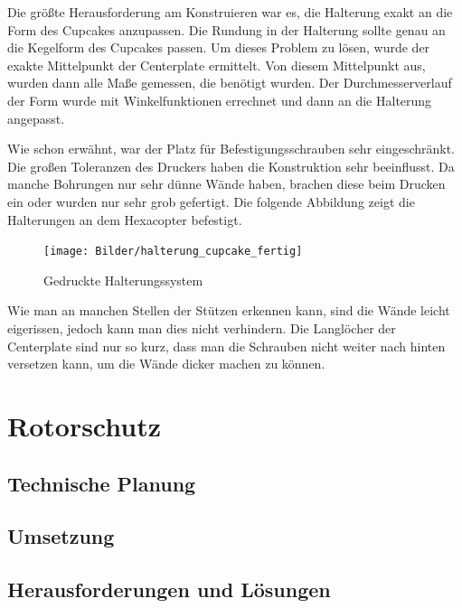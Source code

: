 	Die größte Herausforderung am Konstruieren war es, die Halterung exakt an die Form des Cupcakes anzupassen. Die Rundung in der Halterung sollte genau an die Kegelform des Cupcakes passen.
	Um dieses Problem zu lösen, wurde der exakte Mittelpunkt der Centerplate ermittelt. Von diesem Mittelpunkt aus, wurden dann alle Maße gemessen, die benötigt wurden.
	Der Durchmesserverlauf der Form wurde mit Winkelfunktionen errechnet und dann an die Halterung angepasst.

	Wie schon erwähnt, war der Platz für Befestigungsschrauben sehr eingeschränkt. Die großen Toleranzen des Druckers haben die Konstruktion sehr beeinflusst.
	Da manche Bohrungen nur sehr dünne Wände haben, brachen diese beim Drucken ein oder wurden nur sehr grob gefertigt. Die folgende Abbildung zeigt die Halterungen an dem Hexacopter befestigt.

		\begin{figure}[tbh]
		\begin{centering}
		\texttt{[image: Bilder/halterung\_cupcake\_fertig]}
		\par\end{centering}
		\caption{Gedruckte Halterungssystem}
		\label{halterung_cupcake_fertig}
		\end{figure}

		Wie man an manchen Stellen der Stützen erkennen kann, sind die Wände leicht eigerissen, jedoch kann man dies nicht verhindern.
		Die Langlöcher der Centerplate sind nur so kurz, dass man die Schrauben nicht weiter nach hinten versetzen kann, um die Wände dicker machen zu können.


\section{Rotorschutz}

	\subsection{Technische Planung}

	\subsection{Umsetzung}

	\subsection{Herausforderungen und Lösungen}

